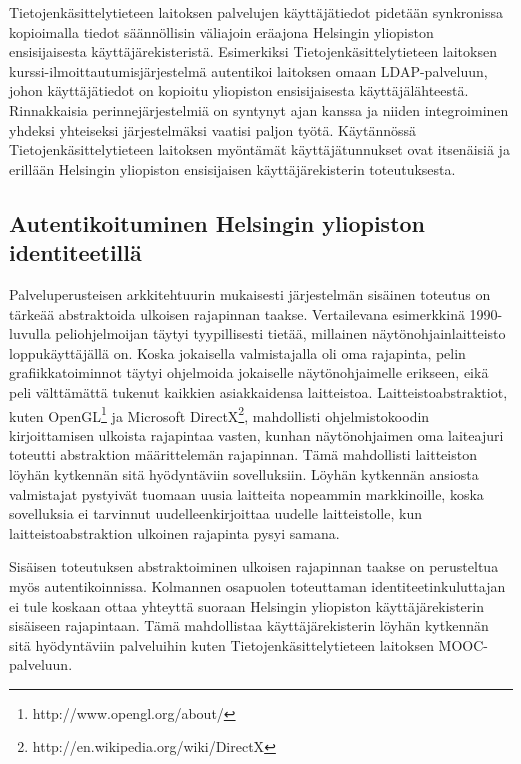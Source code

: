 \documentclass[finnish,gradu]{tktltiki}
\begin{document}
  Tietojenkäsittelytieteen laitoksen palvelujen käyttäjätiedot pidetään synkronissa kopioimalla tiedot säännöllisin väliajoin eräajona Helsingin yliopiston ensisijaisesta käyttäjärekisteristä. Esimerkiksi Tietojenkäsittelytieteen laitoksen kurssi-il\-moit\-tau\-tumisjärjestelmä autentikoi laitoksen omaan LDAP-palveluun, johon käyttäjätiedot on kopioitu yliopiston ensisijaisesta käyttäjälähteestä. Rinnakkaisia perinnejärjestelmiä on syntynyt ajan kanssa ja niiden integroiminen yhdeksi yhteiseksi järjestelmäksi vaatisi paljon työtä. Käytännössä Tietojenkäsittelytieteen laitoksen myöntämät käyttäjätunnukset ovat itsenäisiä ja erillään Helsingin yliopiston ensisijaisen käyttäjärekisterin toteutuksesta.


  \subsection{Autentikoituminen Helsingin yliopiston identiteetillä} %
  \label{sub:autentikointi_helsingin_yliopiston_id}

  Palveluperusteisen arkkitehtuurin mukaisesti järjestelmän sisäinen toteutus on tärkeää abstraktoida ulkoisen rajapinnan taakse. Vertailevana esimerkkinä 1990-luvulla peliohjelmoijan täytyi tyypillisesti tietää, millainen näytönohjainlaitteisto loppukäyttäjällä on. Koska jokaisella valmistajalla oli oma rajapinta, pelin grafiikkatoiminnot täytyi ohjelmoida jokaiselle näytönohjaimelle erikseen, eikä peli välttämättä tukenut kaikkien asiakkaidensa laitteistoa. Laitteistoabstraktiot, kuten OpenGL\footnote{http://www.opengl.org/about/} ja Microsoft DirectX\footnote{http://en.wikipedia.org/wiki/DirectX}, mahdollisti ohjelmistokoodin kirjoittamisen ulkoista rajapintaa vasten, kunhan näytönohjaimen oma laiteajuri toteutti abstraktion määrittelemän rajapinnan. Tämä mahdollisti laitteiston löyhän kytkennän sitä hyödyntäviin sovelluksiin. Löyhän kytkennän ansiosta valmistajat pystyivät tuomaan uusia laitteita nopeammin markkinoille, koska sovelluksia ei tarvinnut uudelleenkirjoittaa uudelle laitteistolle, kun laitteistoabstraktion ulkoinen rajapinta pysyi samana.

  Sisäisen toteutuksen abstraktoiminen ulkoisen rajapinnan taakse on perusteltua myös autentikoinnissa. Kolmannen osapuolen toteuttaman identiteetinkuluttajan ei tule koskaan ottaa yhteyttä suoraan Helsingin yliopiston käyttäjärekisterin sisäiseen rajapintaan. Tämä mahdollistaa käyttäjärekisterin löyhän kytkennän sitä hyödyntäviin palveluihin kuten Tietojenkäsittelytieteen laitoksen MOOC-palveluun.
\end{document}
